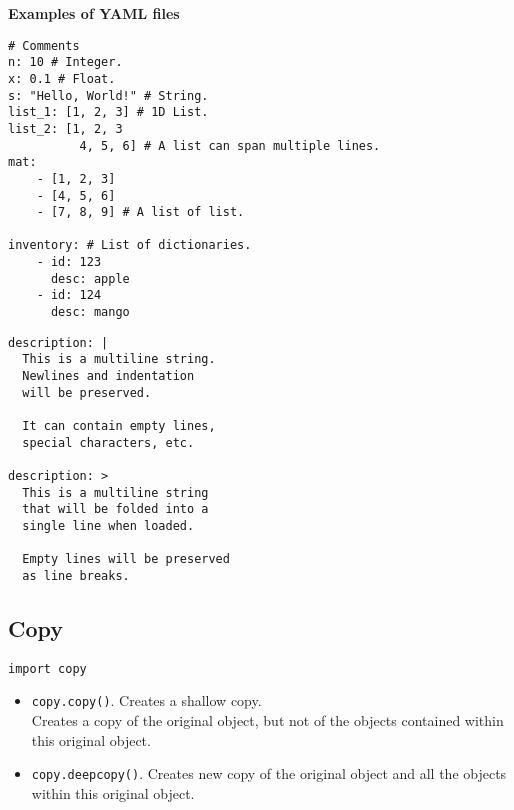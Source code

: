 \textbf{Examples of YAML files}

\begin{mdframed}[backgroundcolor=gray!10,linecolor=Firebrick4]
\begin{verbatim}
# Comments
n: 10 # Integer.
x: 0.1 # Float.
s: "Hello, World!" # String.
list_1: [1, 2, 3] # 1D List.
list_2: [1, 2, 3
          4, 5, 6] # A list can span multiple lines.
mat:
    - [1, 2, 3]
    - [4, 5, 6]
    - [7, 8, 9] # A list of list.

inventory: # List of dictionaries.
    - id: 123
      desc: apple
    - id: 124
      desc: mango

\end{verbatim}
\end{mdframed}

\columnbreak


\begin{mdframed}[backgroundcolor=gray!10,linecolor=Firebrick4]
\begin{verbatim}
description: |
  This is a multiline string.
  Newlines and indentation
  will be preserved.
  
  It can contain empty lines,
  special characters, etc.

description: >
  This is a multiline string
  that will be folded into a
  single line when loaded.
  
  Empty lines will be preserved
  as line breaks.
\end{verbatim}
\end{mdframed}



\subsection{Copy}

\texttt{import copy}

\begin{itemize}
\item \texttt{copy.copy()}. Creates a shallow copy.\\
        Creates a copy of the original object, 
        but not of the objects contained within this original object.\\
\item \texttt{copy.deepcopy()}. Creates new copy of the original object
        and all the objects within this original object.\\
\end{itemize}



